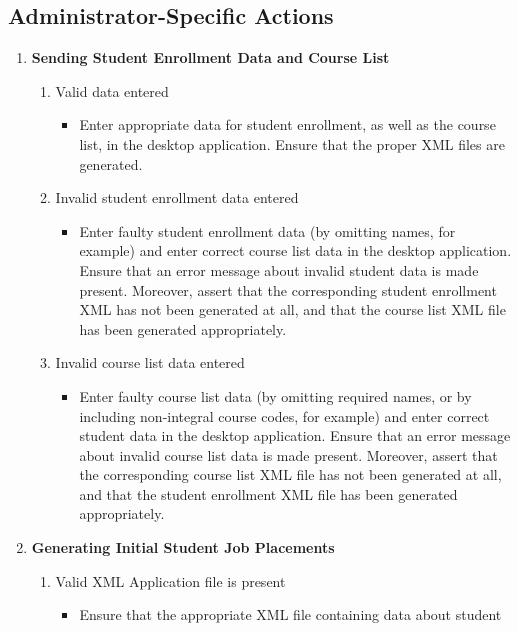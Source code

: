 \documentclass[12pt]{report}
\begin{document}
\subsection{Administrator-Specific Actions}
\begin{enumerate}
	\item \textbf{Sending Student Enrollment Data and Course List}
		\begin{enumerate}
			\item Valid data entered
			\begin{itemize}
				\item Enter appropriate data for student enrollment, as well as the course list, in the
					desktop application. Ensure that the proper XML files are generated.
			\end{itemize}
			\item Invalid student enrollment data entered
			\begin{itemize}
				\item Enter faulty student enrollment data (by omitting names, for example) and
					enter correct course list data in the desktop application. Ensure that an error
					message about invalid student data is made present. Moreover, assert that the
					corresponding student enrollment XML has not been generated at all, and that the
					course list XML file has been generated appropriately.
			\end{itemize}
			\item Invalid course list data entered
			\begin{itemize}
				\item Enter faulty course list data (by omitting required names, or by including
					non-integral course codes, for example) and enter correct student data in the
					desktop application. Ensure that an error message about invalid course list data
					is made present. Moreover, assert that the corresponding course list XML file
					has not been generated at all, and that the student enrollment XML file has been
					generated appropriately.
			\end{itemize}
		\end{enumerate}
	\item \textbf{Generating Initial Student Job Placements}
		\begin{enumerate}
			\item Valid XML Application file is present
				\begin{itemize}
					\item Ensure that the appropriate XML file containing data about student

\end{itemize}
\end{enumerate}
\end{enumerate}
\end{document}
